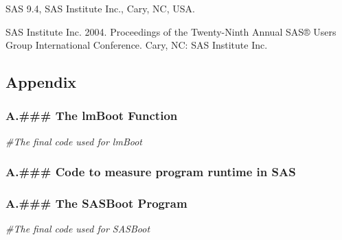 \documentclass[]{article}
\newenvironment{Shaded}{\begin{snugshade}}{\end{snugshade}}
\newcommand{\KeywordTok}[1]{\textcolor[rgb]{0.13,0.29,0.53}{\textbf{#1}}}
\newcommand{\FloatTok}[1]{\textcolor[rgb]{0.00,0.00,0.81}{#1}}
\newcommand{\StringTok}[1]{\textcolor[rgb]{0.31,0.60,0.02}{#1}}
\newcommand{\CommentTok}[1]{\textcolor[rgb]{0.56,0.35,0.01}{\textit{#1}}}
\newcommand{\OperatorTok}[1]{\textcolor[rgb]{0.81,0.36,0.00}{\textbf{#1}}}
\newcommand{\ErrorTok}[1]{\textcolor[rgb]{0.64,0.00,0.00}{\textbf{#1}}}
\newcommand{\NormalTok}[1]{#1}
\begin{document}
SAS 9.4, SAS Institute Inc., Cary, NC, USA.

SAS Institute Inc. 2004. Proceedings of the Twenty-Ninth Annual SAS®
Users Group International Conference. Cary, NC: SAS Institute Inc.

\pagebreak 

\subsection{Appendix}\label{appendix}

\subsubsection{A.\#\#\# The lmBoot
Function}\label{a.-the-lmboot-function}

\begin{Shaded}
\begin{Highlighting}[]
\CommentTok{#The final code used for lmBoot}
\end{Highlighting}
\end{Shaded}

\subsubsection{A.\#\#\# Code to measure program runtime in
SAS}\label{a.-code-to-measure-program-runtime-in-sas}

\begin{Shaded}
\end{Shaded}

\subsubsection{A.\#\#\# The SASBoot
Program}\label{a.-the-sasboot-program}

\begin{Shaded}
\begin{Highlighting}[]
\CommentTok{#The final code used for SASBoot}
\end{Highlighting}
\end{Shaded}
\end{document}
